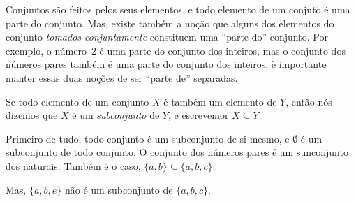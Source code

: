 \documentclass[../../../include/open-logic-section]{subfiles}
\begin{document}


\begin{explain}
Conjuntos são feitos pelos seus elementos, e todo elemento de um conjuto é uma
parte do conjunto. Mas, existe também a noção que alguns dos elementos
do conjunto \emph{tomados conjuntamente} constituem uma ``parte do'' conjunto.
Por exemplo, o número~$2$ é uma parte do conjunto dos inteiros, mas o conjunto
dos números pares também é uma parte do conjunto dos inteiros. è importante
manter essas duas noções de ser ``parte de'' separadas.
\end{explain}


\begin{defn}[Subconjuntos]
Se todo elemento de um conjunto $X$ é também um elemento de $Y$, então
nós dizemos que $X$ é um \emph{subconjunto} de $Y$, e escrevemor $X
    \subseteq Y$.
\end{defn}


\begin{ex}
Primeiro de tudo, todo conjunto
é um subconjunto de si mesmo, e $\emptyset$ é um subconjunto de todo conjunto.
O conjunto dos números pares é um sunconjunto dos naturais. Também é o caso,
$\{ a, b \} \subseteq \{ a, b, c \}$.

Mas, $\{ a, b, e \}$ não é um subconjunto de $\{ a, b, c \}$.
\end{ex}

\end{document}
